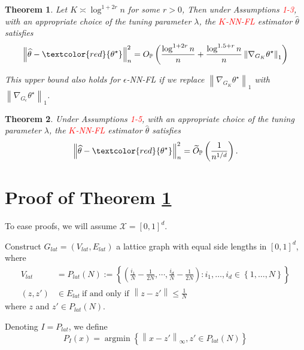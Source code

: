 \documentclass{article}
\newcommand{\norm}[1]{\left\lVert#1\right\rVert}
\newcommand{\set}[1]{\left\{#1\right\}}
\DeclareMathOperator*{\argmin}{argmin}
\newcommand{\Xset}{\mathcal{X}}
\newcommand{\Pbb}{\mathbb{P}}
\theoremstyle{alden}
\theoremstyle{aldenthm}
\newtheorem{theorem}{Theorem}
\theoremstyle{definition}
\theoremstyle{remark}
\begin{document}
\begin{theorem}
	\label{thm: padilla18_theorem_1}
	Let $K \asymp \log^{1 + 2r} n$ for some $r > 0$, Then under Assumptions \textcolor{red}{1-3}, with an appropriate choice of the tuning parameter $\lambda$, the \textcolor{red}{$K$-NN-FL} estimator $\widehat{\theta}$ satisfies
	\begin{equation*}
	\norm{\widehat{\theta} - \textcolor{red}{\theta^{\star}}}_n^2 = O_{\Pbb}\left(\frac{\log^{1 + 2r} n}{n} + \frac{\log^{1.5 + r} n}{n}\norm{\nabla_{G_K} \theta^{\star}}_1 \right)
	\end{equation*}
	
	This upper bound also holds for $\epsilon$-NN-FL if we replace $\norm{\nabla_{G_K} \theta^{\star}}_1 $ with $\norm{\nabla_{G_{\epsilon}} \theta^{\star}}_1$.
\end{theorem}

\begin{theorem}
	\label{thm: padilla18_theorem_2}
	Under Assumptions \textcolor{red}{1-5}, with an appropriate choice of the tuning parameter $\lambda$, the \textcolor{red}{$K$-NN-FL} estimator $\widehat{\theta}$ satisfies
	\begin{equation*}
	\norm{\widehat{\theta} - \textcolor{red}{\theta^{\star}}}_n^2 = \widetilde{O}_{\Pbb}\left( \frac{1}{n^{1/d}} \right).
	\end{equation*}
\end{theorem}

\section{Proof of Theorem \ref{thm: padilla18_theorem_1}}

To ease proofs, we will assume $\Xset = [0,1]^d$. 

Construct $G_{lat} = (V_{lat}, E_{lat})$ a lattice graph with equal side lengths in $[0,1]^d$, where
\begin{align*}
V_{lat} & = P_{lat}(N) := \set{\left(\frac{i_1}{N} - \frac{1}{2N}, \cdots, \frac{i_d}{N} - \frac{1}{2N}\right): i_1, \ldots, i_d \in \set{1, \ldots, N}} \\
(z,z') & \in E_{lat}~ \text{if and only if $\norm{z - z'} \leq \frac{1}{N}$}
\end{align*}
where $z$ and $z' \in P_{lat}(N)$.

Denoting $I = P_{lat}$, we define
\begin{equation*}
P_I(x) = \argmin \set{\norm{x - z'}_{\infty}, z' \in P_{lat}(N)}
\end{equation*}
\end{document}
